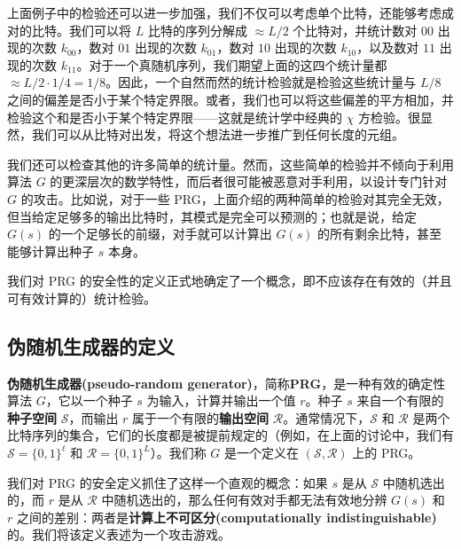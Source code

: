 上面例子中的检验还可以进一步加强，我们不仅可以考虑单个比特，还能够考虑成对的比特。我们可以将 $L$ 比特的序列分解成 $\approx L/2$ 个比特对，并统计数对 $00$ 出现的次数 $k_{00}$，数对 $01$ 出现的次数 $k_{01}$，数对 $10$ 出现的次数 $k_{10}$，以及数对 $11$ 出现的次数 $k_{11}$。对于一个真随机序列，我们期望上面的这四个统计量都 $\approx L/2\cdot 1/4=1/8$。因此，一个自然而然的统计检验就是检验这些统计量与 $L/8$ 之间的偏差是否小于某个特定界限。或者，我们也可以将这些偏差的平方相加，并检验这个和是否小于某个特定界限——这就是统计学中经典的 $\chi$ 方检验。很显然，我们可以从比特对出发，将这个想法进一步推广到任何长度的元组。

我们还可以检查其他的许多简单的统计量。然而，这些简单的检验并不倾向于利用算法 $G$ 的更深层次的数学特性，而后者很可能被恶意对手利用，以设计专门针对 $G$ 的攻击。比如说，对于一些 PRG，上面介绍的两种简单的检验对其完全无效，但当给定足够多的输出比特时，其模式是完全可以预测的；也就是说，给定 $G(s)$ 的一个足够长的前缀，对手就可以计算出 $G(s)$ 的所有剩余比特，甚至能够计算出种子 $s$ 本身。

我们对 PRG 的安全性的定义正式地确定了一个概念，即不应该存在有效的（并且可有效计算的）统计检验。

\subsection{伪随机生成器的定义}\label{subsec:3-1-1}

\textbf{伪随机生成器(pseudo-random generator)}，简称\textbf{PRG}，是一种有效的确定性算法 $G$，它以一个种子 $s$ 为输入，计算并输出一个值 $r$。种子 $s$ 来自一个有限的\textbf{种子空间} $\mathcal{S}$，而输出 $r$ 属于一个有限的\textbf{输出空间} $\mathcal{R}$。通常情况下，$\mathcal{S}$ 和 $\mathcal{R}$ 是两个比特序列的集合，它们的长度都是被提前规定的（例如，在上面的讨论中，我们有 $\mathcal{S}=\{0,1\}^\ell$ 和 $\mathcal{R}=\{0,1\}^L$）。我们称 $G$ 是一个定义在 $(\mathcal{S},\mathcal{R})$ 上的 PRG。

我们对 PRG 的安全定义抓住了这样一个直观的概念：如果 $s$ 是从 $\mathcal{S}$ 中随机选出的，而 $r$ 是从 $\mathcal{R}$ 中随机选出的，那么任何有效对手都无法有效地分辨 $G(s)$ 和 $r$ 之间的差别：两者是\textbf{计算上不可区分(computationally indistinguishable)}的。我们将该定义表述为一个攻击游戏。

